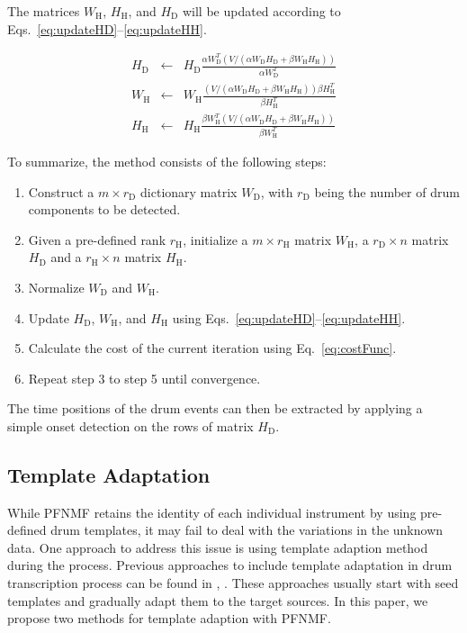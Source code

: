 \documentclass{article}
\begin{document}
The matrices  $W_\mathrm{H}$, $H_\mathrm{H}$, and $H_\mathrm{D}$ will be updated according to \mbox{Eqs.~\eqref{eq:updateHD}--\eqref{eq:updateHH}}.   

\begin{eqnarray}
\label{eq:updateHD}
H_\mathrm{D} &\leftarrow& H_\mathrm{D}\frac{\alpha W_\mathrm{D}^T( V / (\alpha W_\mathrm{D}H_\mathrm{D} + \beta W_\mathrm{H}H_\mathrm{H}))}{\alpha W_\mathrm{D}^T}\\
%
\label{eq:updateWH}
W_\mathrm{H} &\leftarrow& W_\mathrm{H}\frac{(V/(\alpha W_\mathrm{D}H_\mathrm{D} + \beta W_\mathrm{H}H_\mathrm{H})) \beta H_\mathrm{H}^T}{\beta H_\mathrm{H}^T}\\
%
\label{eq:updateHH}
H_\mathrm{H} &\leftarrow& H_\mathrm{H}\frac{\beta W_\mathrm{H}^T (V/(\alpha W_\mathrm{D}H_\mathrm{D} + \beta W_\mathrm{H}H_\mathrm{H}))}{\beta W_\mathrm{H}^T}
\end{eqnarray}

To summarize, the method consists of the following steps:
\begin{enumerate}
    \item   Construct a $m \times r_\mathrm{D}$ dictionary matrix $W_\mathrm{D}$, with $r_\mathrm{D}$ being the number of drum components to be detected.
    \item   Given a pre-defined rank $r_\mathrm{H}$, initialize a $m \times r_\mathrm{H}$ matrix $W_\mathrm{H}$, a $r_\mathrm{D} \times n$ matrix $H_\mathrm{D}$ and a $r_\mathrm{H} \times n$ matrix $H_\mathrm{H}$.
    \item   Normalize $W_\mathrm{D}$ and $W_\mathrm{H}$. 
    \item   Update $H_\mathrm{D}$, $W_\mathrm{H}$, and $H_\mathrm{H}$ using Eqs.~\eqref{eq:updateHD}--\eqref{eq:updateHH}.
    \item   Calculate the cost of the current iteration using Eq.~\eqref{eq:costFunc}.
    \item   Repeat step 3 to step 5 until convergence.
\end{enumerate}
The time positions of the drum events can then be extracted by applying a simple onset detection on the rows of matrix $H_\mathrm{D}$.

\subsection{Template Adaptation}\label{subsec:templateAdapt}
While PFNMF retains the identity of each individual instrument by using pre-defined drum templates, it may fail to deal with the variations in the unknown data. One approach to address this issue is using template adaption method during the process. Previous approaches to include template adaptation in drum transcription process can be found in \cite{yoshii_drum_2007}, \cite{Dittmar2014}. These approaches usually start with seed templates and gradually adapt them to the target sources. In this paper, we propose two methods for template adaption with PFNMF. 
\end{document}
